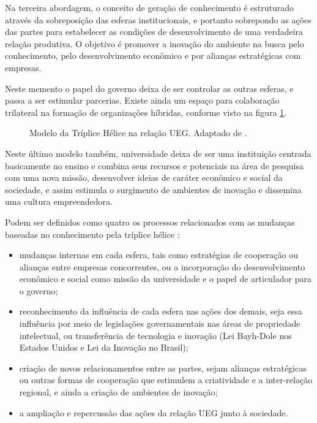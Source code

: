 Na terceira abordagem, o conceito de geração de conhecimento é estruturado através da sobreposição das esferas institucionais, e portanto sobrepondo as ações das partes para estabelecer as condições de desenvolvimento de uma verdadeira relação produtiva. O objetivo é promover a inovação do ambiente na busca pelo conhecimento, pelo desenvolvimento econômico e por alianças estratégicas com empresas.

Neste memento o papel do governo deixa de ser controlar as outras esferas, e passa a ser estimular parcerias. Existe ainda um espaço para colaboração trilateral na formação de organizações híbridas, conforme visto na figura \ref{triplice_helice}.


\begin{figure}[ht]
  \centering
  \caption{Modelo da Tríplice Hélice na relação UEG. Adaptado de \cite{etzkowitz2003innovation}.}
  \label{triplice_helice}
\end{figure}

Neste último modelo também, universidade deixa de ser uma instituição centrada basicamente no ensino e combina seus recursos e potenciais na área de pesquisa com uma nova missão, desenvolver ideias de caráter econômico e social da sociedade, e assim estimula o surgimento de ambientes de inovação e dissemina uma cultura empreendedora.

Podem ser definidos como quatro os processos relacionados com as mudanças baseadas no conhecimento pela tríplice hélice \cite{etzkowitz2003innovation}:

\begin{itemize}
  \item{mudanças internas em cada esfera, tais como estratégias de cooperação ou alianças entre empresas concorrentes, ou a incorporação do desenvolvimento econômico e social como missão da universidade e o papel de articulador para o governo;}
  \item{reconhecimento da influência de cada esfera nas ações dos demais, seja essa influência por meio de legislações governamentais nas áreas de propriedade intelectual, ou transferência de tecnologia e inovação (Lei Bayh-Dole nos Estados Unidos e Lei da Inovação no Brasil);}
  \item{criação de novos relacionamentos entre as partes, sejam alianças estratégicas ou outras formas de cooperação que estimulem a criatividade e a inter-relação regional, e ainda a criação de ambientes de inovação;}
  \item{a ampliação e repercussão das ações da relação UEG junto à sociedade.}
\end{itemize}

